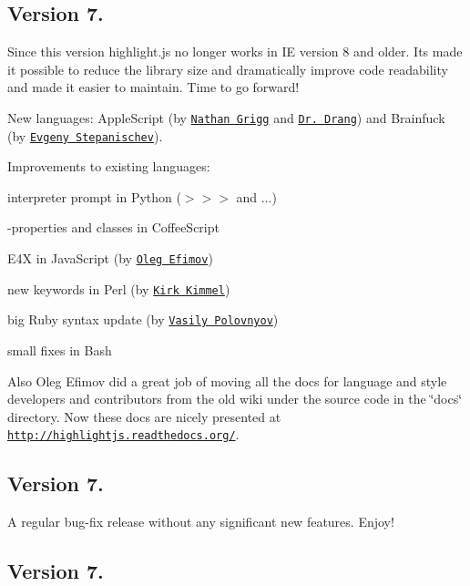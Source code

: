 \subsection*{Version 7.}


\begin{DoxyItemize}
\item Since this version highlight.\+js no longer works in IE version 8 and older. It\textquotesingle{}s made it possible to reduce the library size and dramatically improve code readability and made it easier to maintain. Time to go forward!
\item New languages\+: Apple\+Script (by \href{https://github.com/nathan11g}{\tt Nathan Grigg} and \href{https://github.com/drdrang}{\tt Dr. Drang}) and Brainfuck (by \href{https://github.com/bolknote}{\tt Evgeny Stepanischev}).
\item Improvements to existing languages\+:
\begin{DoxyItemize}
\item interpreter prompt in Python ({\ttfamily $>$$>$$>$} and {\ttfamily ...})
\item -\/properties and classes in Coffee\+Script
\item E4X in Java\+Script (by \href{https://github.com/Sannis}{\tt Oleg Efimov})
\item new keywords in Perl (by \href{https://github.com/kimmel}{\tt Kirk Kimmel})
\item big Ruby syntax update (by \href{https://github.com/vast}{\tt Vasily Polovnyov})
\item small fixes in Bash
\end{DoxyItemize}
\item Also Oleg Efimov did a great job of moving all the docs for language and style developers and contributors from the old wiki under the source code in the \char`\"{}docs\char`\"{} directory. Now these docs are nicely presented at \href{http://highlightjs.readthedocs.org/}{\tt http\+://highlightjs.\+readthedocs.\+org/}.
\end{DoxyItemize}

\subsection*{Version 7.}

A regular bug-\/fix release without any significant new features. Enjoy!

\subsection*{Version 7.}

